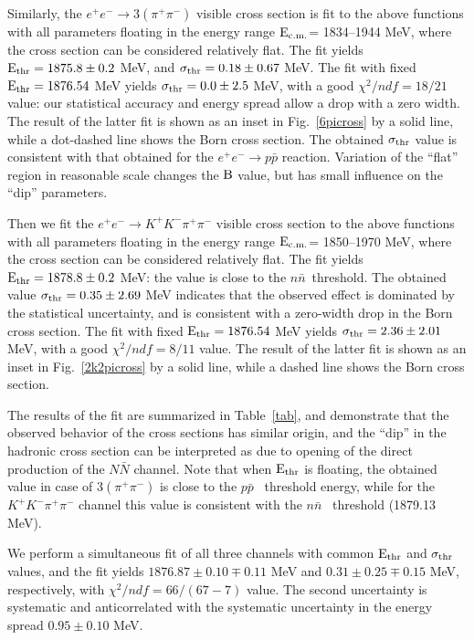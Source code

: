 \documentclass[12pt]{elsarticle}
\def\Ecm {\ensuremath{\rm E_{\rm c.m.}}}
\def\epem {\ensuremath{e^+ e^-}}
\def\pipi {\ensuremath{\pi^+\pi^-}}
\def\ppbar {\ensuremath{p\bar p}}
\def\nnbar {\ensuremath{n\bar n}}
\def\NNbar {\ensuremath{N\bar N}}
\begin{document}
Similarly, the $e^+e^-\to 3(\pi^+\pi^-)$ visible cross section is fit
to the above functions with all parameters floating  
in the energy range \Ecm = 1834--1944 MeV, where the cross section can be 
considered relatively flat. The fit yields $\rm E_{thr} = 1875.8 \pm 0.2$ MeV, and 
$\rm \sigma_{thr} = 0.18 \pm 0.67$ MeV.  The fit with fixed 
$\rm E_{thr} = 1876.54$ MeV  yields $\rm \sigma_{thr} = 0.0 \pm 2.5$ MeV, 
 with a good $\chi^2/ndf = 18/21$ value: our statistical accuracy and energy spread 
allow a drop with 
a zero width.  The result of the latter fit is shown as an inset in
Fig.~\ref{6picross} by a solid line, while a dot-dashed line shows the 
Born cross section.  
The obtained $\rm \sigma_{thr}$ value is consistent with that obtained for 
the $\epem\to\ppbar$ reaction. Variation of the ``flat'' region in reasonable 
scale changes the $\rm B$ value, but has small influence on 
the ``dip'' parameters.

Then we fit the $e^+e^-\to K^+K^-\pi^+\pi^-$ visible cross
section to the above functions with all parameters floating in the
energy range \Ecm = 1850--1970 MeV, where the cross section can be  
considered relatively flat. The fit yields $\rm E_{thr} = 1878.8 \pm 0.2$ MeV:
the value is close to the \nnbar~threshold.  The obtained value
$\rm \sigma_{thr} = 0.35 \pm 2.69$ MeV indicates that the observed effect 
is dominated by the statistical uncertainty, and is consistent with 
a zero-width drop in the Born cross section.  
The fit with fixed $\rm E_{thr} = 1876.54$ MeV  yields 
$\rm \sigma_{thr} = 2.36 \pm 2.01$ MeV, 
 with a good $\chi^2/ndf = 8/11$ value.  The result of the
latter fit is shown as an inset in Fig.~\ref{2k2picross} by a solid line,
while a dashed line shows the Born cross section.  

The results of the fit are summarized in Table~\ref{tab}, and  demonstrate 
that the observed behavior of the cross sections has 
similar origin, and the ``dip'' in the hadronic cross section can be 
interpreted as due to opening of the direct production of the $\NNbar$ channel.
Note that when $\rm E_{thr}$ is floating, the obtained value in case of $3(\pipi)$ is close to the \ppbar~ threshold energy, while for the $K^+K^-\pi^+\pi^-$ channel this value is consistent with the \nnbar~ threshold (1879.13 MeV). 

We perform a simultaneous fit of all three channels with common 
$\rm E_{thr}$ and $\rm \sigma_{thr}$ values, and the fit yields
$1876.87\pm0.10\mp0.11$ MeV and  $0.31\pm0.25\mp0.15$ MeV, respectively, with
$\chi^2/ndf = 66/(67-7)$ value. The second uncertainty is systematic
and anticorrelated with the systematic uncertainty in the energy spread
$0.95\pm0.10$ MeV.
\end{document}
